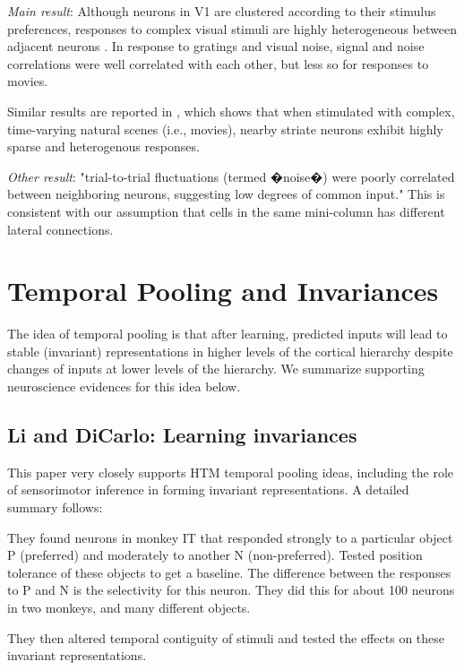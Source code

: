 \documentclass{article} %
\begin{document}
\emph{Main result}: Although neurons in V1 are clustered according to their stimulus
 preferences, responses to complex visual stimuli are highly heterogeneous between 
 adjacent neurons \cite{Martin2013}. In response to gratings and visual noise, signal and noise 
 correlations were well correlated with each other, but less so for responses to movies. 
 
 Similar results are reported in \cite{Yen2007}, which shows that when stimulated with 
 complex, time-varying natural scenes (i.e., movies), nearby striate neurons exhibit highly 
 sparse and heterogenous responses.
 
\emph{Other result}: "trial-to-trial fluctuations (termed �noise�) were poorly correlated between 
 neighboring neurons, suggesting low degrees of common input." This is consistent with 
 our assumption that cells in the same mini-column has different lateral connections.
 
\section{Temporal Pooling and Invariances}

The idea of temporal pooling is that after learning, predicted inputs will
lead to stable (invariant) representations in higher levels of the cortical
hierarchy despite changes of inputs at lower levels of the hierarchy. We
summarize supporting neuroscience evidences for this idea below.

\subsection{Li and DiCarlo: Learning invariances}

This paper \cite{Li2008} very closely supports HTM temporal pooling ideas,
including the role of sensorimotor inference in forming invariant
representations.  A detailed summary follows:

They found neurons in monkey IT that responded strongly to a particular object
P (preferred) and moderately to another N (non-preferred). Tested position
tolerance of these objects to get a baseline.  The difference between the
responses to P and N is the selectivity for this neuron.  They did this
for about 100 neurons in two monkeys, and many different objects.

They then altered temporal contiguity of stimuli and tested the effects on these
invariant representations.
\end{document}
